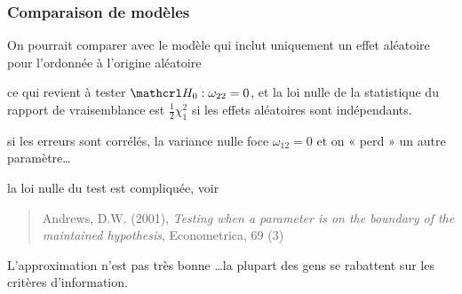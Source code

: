 \documentclass{beamer}
\begin{document}
\begin{frame}
\frametitle{Comparaison de modèles}
\bi \item 
 On pourrait comparer avec le modèle qui inclut uniquement un effet aléatoire pour l'ordonnée à l'origine aléatoire
 \bi \item ce qui revient à tester $\Hy_0: \omega_{22}=0$, et la loi nulle de la statistique du rapport de vraisemblance est $\frac{1}{2} \chi^2_1$ si les effets aléatoires sont indépendants.
\item si les erreurs sont corrélés, la variance nulle foce $\omega_{12}=0$ et on « perd » un autre paramètre\ldots
 \item la loi nulle du test est compliquée, voir
 \begin{quote} Andrews, D.W. (2001), \textsl{Testing when a parameter is on the boundary of the maintained hypothesis}, Econometrica, 69 (3)
  \end{quote}
  \ei
\item L'approximation n'est pas très bonne \ldots la plupart des gens se rabattent sur les critères d'information.

 \ei
\end{frame}
\end{document}
